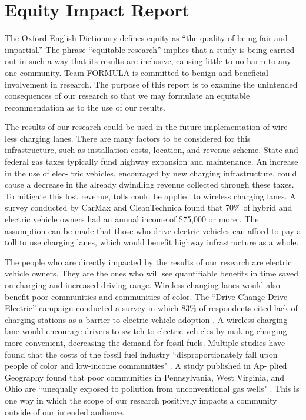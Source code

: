 \appendix
\renewcommand{\thechapter}{A}
\renewcommand{\chaptername}{Appendix}

\chapter{Equity Impact Report}

The Oxford English Dictionary defines equity as “the quality of being fair and impartial.” 
The phrase “equitable research” implies that a study is being carried out in such a way that 
its results are inclusive, causing little to no harm to any one community. 
Team FORMULA is committed to benign and beneficial involvement in research. 
The purpose of this report is to examine the unintended consequences of our research so 
that we may formulate an equitable recommendation as to the use of our results.

The results of our research could be used in the future implementation of wire- less charging lanes. 
There are many factors to be considered for this infrastructure, such as installation costs, location, 
and revenue scheme. State and federal gas taxes typically fund highway expansion and maintenance. 
An increase in the use of elec- tric vehicles, encouraged by new charging infrastructure, could 
cause a decrease in the already dwindling revenue collected through these taxes. To mitigate this lost revenue, 
tolls could be applied to wireless charging lanes. A survey conducted by CarMax and CleanTechnica found 
that 70\% of hybrid and electric vehicle owners had an annual income of \$75,000 or more 
\cite{noauthor_2017_nodate}. The assumption can be made that those who drive electric vehicles can 
afford to pay a toll to use charging lanes, which would benefit highway infrastructure as a whole. 

The people who are directly impacted by the results of our research are electric vehicle owners. 
They are the ones who will see quantifiable benefits in time saved on charging and increased driving range. 
Wireless changing lanes would also benefit poor communities and communities of color. 
The “Drive Change Drive Electric” campaign conducted a survey in which 83\% of respondents cited lack of 
charging stations as a barrier to electric vehicle adoption \cite{nhede_new_2019}. 
A wireless charging lane would encourage drivers to switch to electric vehicles by making charging more 
convenient, decreasing the demand for fossil fuels. Multiple studies have found that the costs of the fossil 
fuel industry “disproportionately fall upon people of color and low-income communities" \cite{noauthor_i-1631_nodate}.
A study published in Ap- plied Geography found that poor communities in Pennsylvania, West Virginia, and Ohio are 
“unequally exposed to pollution from unconventional gas wells" \cite{ogneva-himmelberger_spatial_2015}.
This is one way in which the scope of our research positively impacts a community outside of our intended audience.


